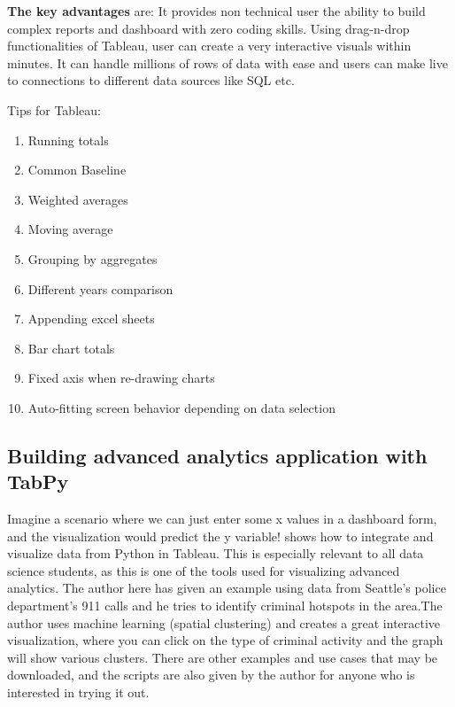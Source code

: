 \documentclass[]{book}
\providecommand{\tightlist}{%
  \setlength{\itemsep}{0pt}\setlength{\parskip}{0pt}}
\theoremstyle{definition}
\theoremstyle{definition}
\theoremstyle{definition}
\theoremstyle{remark}
\begin{document}
\textbf{The key advantages} are: It provides non technical user the
ability to build complex reports and dashboard with zero coding skills.
Using drag-n-drop functionalities of Tableau, user can create a very
interactive visuals within minutes. It can handle millions of rows of
data with ease and users can make live to connections to different data
sources like SQL etc.

Tips for Tableau:

\begin{enumerate}
\def\labelenumi{\arabic{enumi}.}
\tightlist
\item
  Running totals
\item
  Common Baseline
\item
  Weighted averages
\item
  Moving average
\item
  Grouping by aggregates
\item
  Different years comparison
\item
  Appending excel sheets
\item
  Bar chart totals
\item
  Fixed axis when re-drawing charts
\item
  Auto-fitting screen behavior depending on data selection
\end{enumerate}

\citep{VizBP} \citep{ExtremePre}

\subsection{Building advanced analytics application with
TabPy}\label{building-advanced-analytics-application-with-tabpy}

Imagine a scenario where we can just enter some x values in a dashboard
form, and the visualization would predict the y variable! \citep{TabPy}
shows how to integrate and visualize data from Python in Tableau. This
is especially relevant to all data science students, as this is one of
the tools used for visualizing advanced analytics. The author here has
given an example using data from Seattle's police department's 911 calls
and he tries to identify criminal hotspots in the area.The author uses
machine learning (spatial clustering) and creates a great interactive
visualization, where you can click on the type of criminal activity and
the graph will show various clusters. There are other examples and use
cases that may be downloaded, and the scripts are also given by the
author for anyone who is interested in trying it out.
\end{document}

